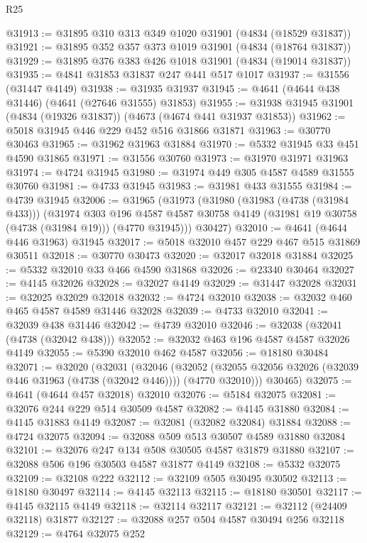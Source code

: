 \begin{lexlean}{R25}
\begin{coremodule}
@31913 := @31895 @310 @313 @349 @1020 @31901 (@4834 (@18529 @31837))
@31921 := @31895 @352 @357 @373 @1019 @31901 (@4834 (@18764 @31837))
@31929 := @31895 @376 @383 @426 @1018 @31901 (@4834 (@19014 @31837))
@31935 := @4841 @31853 @31837 @247 @441 @517 @1017
@31937 := @31556 (@31447 @4149)
@31938 := @31935 @31937
@31945 := @4641 (@4644 @438 @31446) (@4641 (@27646 @31555) @31853)
@31955 := @31938 @31945 @31901 (@4834 (@19326 @31837)) (@4673 (@4674 @441 @31937 @31853))
@31962 := @5018 @31945 @446 @229 @452 @516 @31866 @31871
@31963 := @30770 @30463
@31965 := @31962 @31963 @31884
@31970 := @5332 @31945 @33 @451 @4590 @31865
@31971 := @31556 @30760
@31973 := @31970 @31971 @31963
@31974 := @4724 @31945
@31980 := @31974 @449 @305 @4587 @4589 @31555 @30760
@31981 := @4733 @31945
@31983 := @31981 @433 @31555
@31984 := @4739 @31945
@32006 := @31965
    (@31973
      (@31980
        (@31983 (@4738 (@31984 @433)))
        (@31974
          @303
          @196
          @4587
          @4587
          @30758
          @4149
          (@31981 @19 @30758 (@4738 (@31984 @19)))
          (@4770 @31945)))
      @30427)
@32010 := @4641 (@4644 @446 @31963) @31945
@32017 := @5018 @32010 @457 @229 @467 @515 @31869 @30511
@32018 := @30770 @30473
@32020 := @32017 @32018 @31884
@32025 := @5332 @32010 @33 @466 @4590 @31868
@32026 := @23340 @30464
@32027 := @4145 @32026
@32028 := @32027 @4149
@32029 := @31447 @32028
@32031 := @32025 @32029 @32018
@32032 := @4724 @32010
@32038 := @32032 @460 @465 @4587 @4589 @31446 @32028
@32039 := @4733 @32010
@32041 := @32039 @438 @31446
@32042 := @4739 @32010
@32046 := @32038 (@32041 (@4738 (@32042 @438)))
@32052 := @32032 @463 @196 @4587 @4587 @32026 @4149
@32055 := @5390 @32010 @462 @4587
@32056 := @18180 @30484
@32071 := @32020
    (@32031
      (@32046
        (@32052 (@32055 @32056 @32026 (@32039 @446 @31963 (@4738 (@32042 @446)))) (@4770 @32010)))
      @30465)
@32075 := @4641 (@4644 @457 @32018) @32010
@32076 := @5184 @32075
@32081 := @32076 @244 @229 @514 @30509 @4587
@32082 := @4145 @31880
@32084 := @4145 @31883 @4149
@32087 := @32081 (@32082 @32084) @31884
@32088 := @4724 @32075
@32094 := @32088 @509 @513 @30507 @4589 @31880 @32084
@32101 := @32076 @247 @134 @508 @30505 @4587 @31879 @31880
@32107 := @32088 @506 @196 @30503 @4587 @31877 @4149
@32108 := @5332 @32075
@32109 := @32108 @222
@32112 := @32109 @505 @30495 @30502
@32113 := @18180 @30497
@32114 := @4145 @32113
@32115 := @18180 @30501
@32117 := @4145 @32115 @4149
@32118 := @32114 @32117
@32121 := @32112 (@24409 @32118) @31877
@32127 := @32088 @257 @504 @4587 @30494 @256 @32118
@32129 := @4764 @32075 @252

\end{coremodule}
\end{lexlean}
